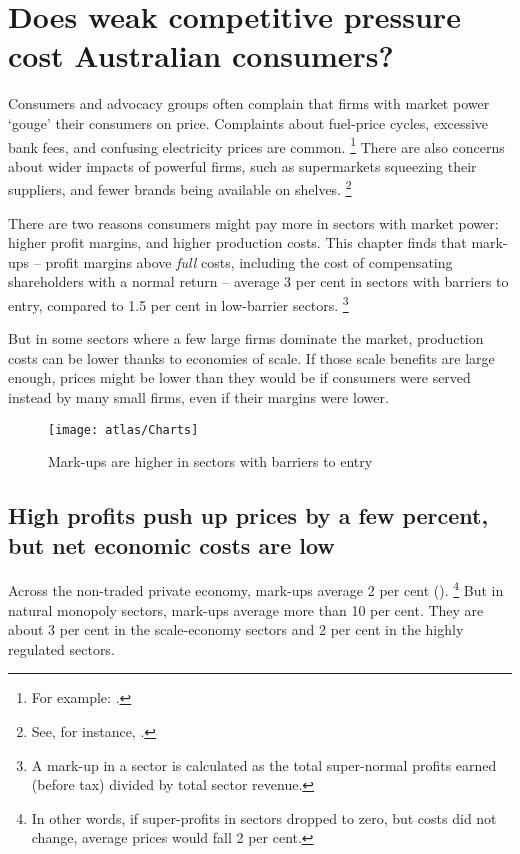 \chapter{Does weak competitive pressure cost Australian consumers? \label{chap:welfare}}

Consumers and advocacy groups often complain that firms with market power `gouge' their consumers on price. Complaints about fuel-price cycles, excessive bank fees, and confusing electricity prices are common.%
    \footnote{For example: \textcites{supermoney-bank-rip-off}{courier-mail-fuel-price-cycle}{herald-sun-fuel-price-cycle}{make-it-cheaper-electricity-price-gouging}.}
There are also concerns about wider impacts of powerful firms, such as supermarkets squeezing their suppliers, and fewer brands being available on shelves.%
    \footnote{See, for instance, \textcites{monthly-supermarkets}{choice-brands-disappearing}.}

There are two reasons consumers might pay more in sectors with market power: higher profit margins, and higher production costs.
This chapter finds that mark-ups -- profit margins above \emph{full} costs, including the cost of compensating shareholders with a normal return -- average 3 per cent in sectors with barriers to entry, compared to 1.5 per cent in low-barrier sectors.%
    \footnote{A mark-up in a sector is calculated as the total super-normal profits earned (before tax) divided by total sector revenue.}

But in some sectors where a few large firms dominate the market, production costs can be lower thanks to economies of scale. If those scale benefits are large enough, prices might be lower than they would be if consumers were served instead by many small firms, even if their margins were lower. 

\begin{figure}
    \caption{Mark-ups are higher in sectors with barriers to entry \label{fig:SNP-pc-of-rev}}
    \texttt{[image: atlas/Charts]} 
\end{figure}

\section{High profits push up prices by a few percent, but net economic costs are low} 
Across the non-traded private economy, mark-ups average 2 per cent ().%
    \footnote{In other words, if super-profits in sectors dropped to zero, but costs did not change, average prices would fall 2 per cent.}
But in natural monopoly sectors, mark-ups average more than 10 per cent. They are about 3 per cent in the scale-economy sectors and 2 per cent in the highly regulated sectors.

